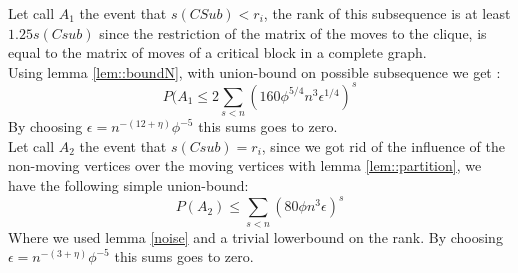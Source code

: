 Let call $A_1$ the event that $s(CSub) < r_i$, the rank of this subsequence is at least $1.25 s(Csub)$ since the restriction of the matrix of the moves to the clique, is equal to the matrix of moves of a critical block in a complete graph.\\
Using lemma \ref{lem::boundN}, with union-bound on possible subsequence we get :
\begin{equation*}
P(A_1 \leq 2 \sum_{s < n}(160\phi^{5/4}n^3\epsilon^{1/4})^s
\end{equation*}
By choosing $\epsilon = n^{-(12 + \eta)}\phi^{-5}$ this sums goes to zero.\\

Let call $A_2$ the event that $s(Csub) = r_i$, since we got rid of the influence of the non-moving vertices over the moving vertices with lemma \ref{lem::partition}, we have the following simple union-bound:
\begin{equation*}
P(A_2) \leq \sum_{s < n}(80\phi n^3 \epsilon)^s
\end{equation*}
Where we used lemma \ref{noise} and a trivial lowerbound on the rank.
By choosing $\epsilon = n^{-(3 + \eta)}\phi^{-5}$ this sums goes to zero. 

